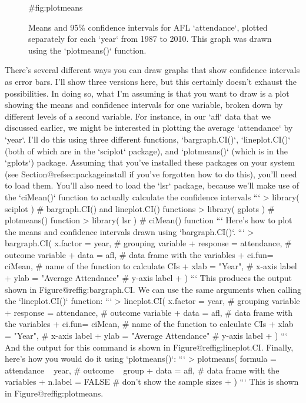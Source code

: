 \begin{figure}
\begin{center}
\caption{Means and 95\% confidence intervals for AFL `attendance`, plotted separately for each `year` from 1987 to 2010. This graph was drawn using the `plotmeans()` function.}
{#fig:plotmeans}
\HR
\end{center}
\end{figure}


There's several different ways you can draw graphs that show confidence intervals as error bars. I'll show three versions here, but this certainly doesn't exhaust the possibilities. In doing so, what I'm assuming is that you want to draw is a plot showing the means and confidence intervals for one variable, broken down by different levels of a second variable. For instance, in our `afl` data that we discussed earlier, we might be interested in plotting the average `attendance` by `year`. I'll do this using three different functions, `bargraph.CI()`, `lineplot.CI()` (both of which are in the `sciplot` package), and `plotmeans()` (which is in the `gplots`) package. Assuming that you've installed these packages on your system (see Section@refsec:packageinstall if you've forgotten how to do this), you'll need to load them. You'll also need to load the `lsr` package, because we'll make use of the `ciMean()` function to actually calculate the confidence intervals
```
> library( sciplot )     # bargraph.CI() and lineplot.CI() functions
> library( gplots )      # plotmeans() function
> library( lsr )         # ciMean() function
```
Here's how to plot the means and confidence intervals drawn using `bargraph.CI()`.
```
> bargraph.CI( x.factor = year,            # grouping variable 
+              response = attendance,      # outcome variable
+              data = afl,                 # data frame with the variables
+              ci.fun= ciMean,             # name of the function to calculate CIs
+              xlab = "Year",              # x-axis label
+              ylab = "Average Attendance" # y-axis label
+ )
```
This produces the output shown in Figure@reffig:bargraph.CI. We can use the same arguments when calling the `lineplot.CI()` function:
```
> lineplot.CI( x.factor = year,            # grouping variable 
+              response = attendance,      # outcome variable
+              data = afl,                 # data frame with the variables
+              ci.fun= ciMean,             # name of the function to calculate CIs
+              xlab = "Year",              # x-axis label
+              ylab = "Average Attendance" # y-axis label
+ )
```
And the output for this command is shown in Figure@reffig:lineplot.CI.  Finally, here's how you would do it using `plotmeans()`:
```
> plotmeans( formula = attendance ~ year,  # outcome ~ group 
+            data = afl,                   # data frame with the variables
+            n.label = FALSE               # don't show the sample sizes
+ )
```
This is shown in Figure@reffig:plotmeans.


